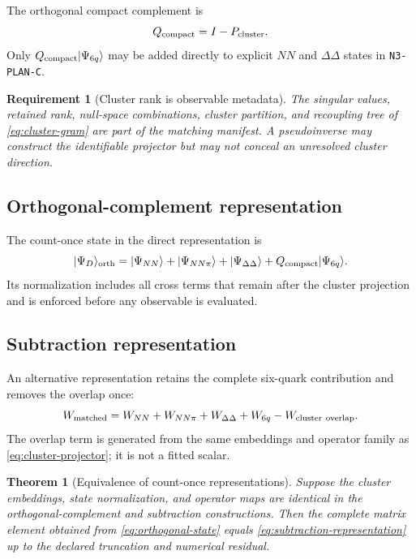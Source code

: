 \documentclass[11pt]{article}
\newtheorem{requirement}[definition]{Requirement}
\newtheorem{theorem}[definition]{Theorem}
\begin{document}
The orthogonal compact complement is
\begin{equation}
 Q_{\rm compact}=I-P_{\rm cluster}.
\label{eq:compact-complement}
\end{equation}
Only \(Q_{\rm compact}|\Psi_{6q}\rangle\) may be added directly to explicit \(NN\) and \(\Delta\Delta\) states in \texttt{N3-PLAN-C}.

\begin{requirement}[Cluster rank is observable metadata]
The singular values, retained rank, null-space combinations, cluster partition, and recoupling tree of \cref{eq:cluster-gram} are part of the matching manifest.  A pseudoinverse may construct the identifiable projector but may not conceal an unresolved cluster direction.
\label{req:cluster-rank}
\end{requirement}

\subsection{Orthogonal-complement representation}

The count-once state in the direct representation is
\begin{equation}
 |\Psi_D\rangle_{\rm orth}
 =|\Psi_{NN}\rangle
 +|\Psi_{NN\pi}\rangle
 +|\Psi_{\Delta\Delta}\rangle
 +Q_{\rm compact}|\Psi_{6q}\rangle.
\label{eq:orthogonal-state}
\end{equation}
Its normalization includes all cross terms that remain after the cluster projection and is enforced before any observable is evaluated.

\subsection{Subtraction representation}

An alternative representation retains the complete six-quark contribution and removes the overlap once:
\begin{equation}
 W_{\rm matched}
 =W_{NN}+W_{NN\pi}+W_{\Delta\Delta}+W_{6q}
 -W_{\rm cluster\ overlap}.
\label{eq:subtraction-representation}
\end{equation}
The overlap term is generated from the same embeddings and operator family as \cref{eq:cluster-projector}; it is not a fitted scalar.

\begin{theorem}[Equivalence of count-once representations]
Suppose the cluster embeddings, state normalization, and operator maps are identical in the orthogonal-complement and subtraction constructions.  Then the complete matrix element obtained from \cref{eq:orthogonal-state} equals \cref{eq:subtraction-representation} up to the declared truncation and numerical residual.
\label{thm:count-once-equivalence}
\end{theorem}
\end{document}
